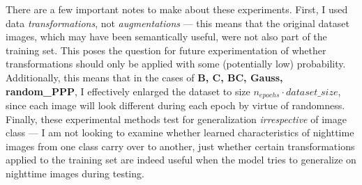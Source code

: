 \documentclass{article}
\begin{document}
There are a few important notes to make about these experiments. First, I used data \textit{transformations}, not \textit{augmentations} --- this means that the original dataset images, which may have been semantically useful, were not also part of the training set. This poses the question for future experimentation of whether transformations should only be applied with some (potentially low) probability. Additionally, this means that in the cases of \textbf{B, C, BC, Gauss, random\_PPP}, I effectively enlarged the dataset to size $n_{epochs} \cdot dataset\_size$, since each image will look different during each epoch by virtue of randomness. Finally, these experimental methods test for generalization \textit{irrespective} of image class --- I am not looking to examine whether learned characteristics of nighttime images from one class carry over to another, just whether certain transformations applied to the training set are indeed useful when the model tries to generalize on nighttime images during testing.
 
\end{document}

